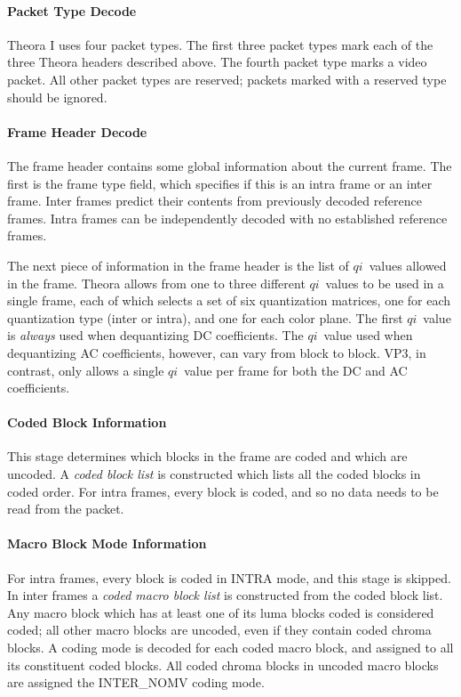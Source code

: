 \documentclass[9pt,letterpaper]{book}
\newcommand{\idx}[1]{{\ensuremath{\mathit{#1}}}}
\newcommand{\qi}{\idx{qi}}
\newcommand{\term}[1]{{\em #1}}
\numberwithin{equation}{chapter}
\numberwithin{figure}{chapter}
\numberwithin{table}{chapter}
\begin{document}
\paragraph{Packet Type Decode}

Theora I uses four packet types.
The first three packet types mark each of the three Theora headers described
 above.
The fourth packet type marks a video packet.
All other packet types are reserved; packets marked with a reserved type should
 be ignored.

\paragraph{Frame Header Decode}

The frame header contains some global information about the current frame.
The first is the frame type field, which specifies if this is an intra frame or
 an inter frame.
Inter frames predict their contents from previously decoded reference frames.
Intra frames can be independently decoded with no established reference frames.

The next piece of information in the frame header is the list of \qi\ values
 allowed in the frame.
Theora allows from one to three different \qi\ values to be used in a single
 frame, each of which selects a set of six quantization matrices, one for each
 quantization type (inter or intra), and one for each color plane.
The first \qi\ value is {\em always} used when dequantizing DC coefficients.
The \qi\ value used when dequantizing AC coefficients, however, can vary from
 block to block.
VP3, in contrast, only allows a single \qi\ value per frame for both the DC and
 AC coefficients.

\paragraph{Coded Block Information}

This stage determines which blocks in the frame are coded and which are
 uncoded.
A \term{coded block list} is constructed which lists all the coded blocks in
 coded order.
For intra frames, every block is coded, and so no data needs to be read from
 the packet.

\paragraph{Macro Block Mode Information}

For intra frames, every block is coded in INTRA mode, and this stage is
 skipped.
In inter frames a \term{coded macro block list} is constructed from the coded
 block list.
Any macro block which has at least one of its luma blocks coded is considered
 coded; all other macro blocks are uncoded, even if they contain coded chroma
 blocks.
A coding mode is decoded for each coded macro block, and assigned to all its
 constituent coded blocks.
All coded chroma blocks in uncoded macro blocks are assigned the INTER\_NOMV
 coding mode.
\end{document}
